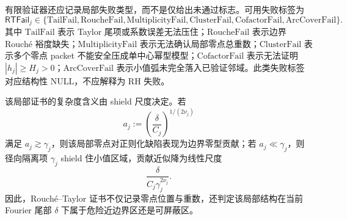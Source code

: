 有限验证器还应记录局部失败类型，而不是仅给出未通过标志。可用失败标签为
\[
\mathsf{RTFail}_j
\in
\{
\mathrm{TailFail},
\mathrm{RoucheFail},
\mathrm{MultiplicityFail},
\mathrm{ClusterFail},
\mathrm{CofactorFail},
\mathrm{ArcCoverFail}
\}.
\]
其中 \(\mathrm{TailFail}\) 表示 Taylor 尾项或系数误差无法压住；\(\mathrm{RoucheFail}\) 表示边界 Rouch\'e 裕度缺失；\(\mathrm{MultiplicityFail}\) 表示无法确认局部零点总重数；\(\mathrm{ClusterFail}\) 表示多个零点 packet 不能安全压成单中心幂型模型；\(\mathrm{CofactorFail}\) 表示无法证明 \(|h_j|\ge H_j>0\)；\(\mathrm{ArcCoverFail}\) 表示小值弧未完全落入已验证邻域。此类失败标签对应结构性 \(\mathrm{NULL}\)，不应解释为 RH 失败。

该局部证书的复杂度含义由 shield 尺度决定。若
\[
a_j:=\left(\frac{\delta}{C_j}\right)^{1/(2\nu_j)}
\]
满足 \(a_j\gtrsim\gamma_j\)，则该局部零点对正则化缺陷表现为边界零型贡献；若 \(a_j\ll\gamma_j\)，则径向隔离项 \(\gamma_j\) shield 住小值区域，贡献近似降为线性尺度
\[
\frac{\delta}{C_j\gamma_j^{2\nu_j}}.
\]
因此，Rouch\'e--Taylor 证书不仅记录零点位置与重数，还判定该局部结构在当前 Fourier 尾部 \(\delta\) 下属于危险近边界区还是可屏蔽区。
